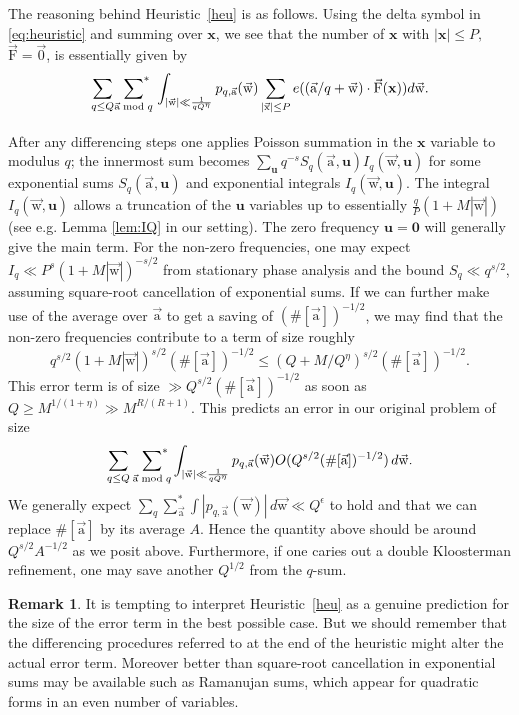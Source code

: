 \documentclass[letterpaper,11pt]{amsart}
\numberwithin{equation}{section}
\theoremstyle{definition}
\newtheorem{remark}[theorem]{Remark}
\numberwithin{equation}{section}
\newcommand{\x}{\mathbf{x}}
\newcommand{\uu}{\mathbf{u}}
\newcommand{\starsum}{\sideset{}{^*}\sum}
\newcommand{\ux}{{\vec{\mathrm{x}}}}
\newcommand{\ua}{\vec{\mathrm{a}}}
\newcommand{\uw}{{\vec{\mathrm{w}}}}
\newcommand{\uF}{{\vec{\mathrm{F}} }}
\begin{document}
The reasoning behind Heuristic~\ref{heu} is as follows. Using the delta symbol in \eqref{eq:heuristic} and summing over $\x$, we see that the number of $\x$ with $|\x|\leq P,$ $\uF=\vec{0}$, is essentially given by
\begin{equation*}
    \sum_{q\leq Q}\underset{\hphantom{\ua\bmod{q}}}{\starsum_{\ua\bmod{q}}}
\int_{|\uw|\ll \frac{1}{qQ^{\eta}}}p_{q, \ua}(\uw)\sum_{|\ux|\leq P}e((\ua/q+\uw)\cdot \uF (\mathbf{x}))
			d\uw.
\end{equation*}
After any differencing steps one applies Poisson summation in the $\x$ variable to modulus $q$; the innermost sum becomes $\sum_{\uu} q^{-s}S_q(\ua,\uu)I_q(\uw,\uu)$ for some exponential sums $S_q(\ua, \uu)$ and exponential integrals $I_q(\uw, \uu)$. The integral $I_q(\uw, \uu)$ allows a truncation of the $\uu$ variables up to essentially $\frac{q}{P}(1+M|\uw|)$ (see e.g. Lemma \ref{lem:IQ} in our setting). The zero frequency $\uu=\mathbf 0$ will generally give the main term. For the non-zero frequencies, one may expect $I_q\ll P^s(1+M|\uw|)^{-s/2}$ from stationary phase analysis and the bound $S_q\ll q^{s/2}$, assuming square-root cancellation of exponential sums. If we can further make use of the average over $\ua$ to get a saving of $(\#[\ua])^{-1/2}$, we may find that the non-zero frequencies contribute to a term of size roughly $$q^{s/2}(1+M|\uw|)^{s/2}(\#[\ua])^{-1/2}\leq (Q+M/Q^\eta)^{s/2}(\#[\ua])^{-1/2}.$$ This error term is of size $\gg Q^{s/2}(\#[\ua])^{-1/2}$ as soon as $Q\geq M^{1/(1+\eta)}\gg M^{R/(R+1)}$. This predicts an error in our original problem of size
$$
\sum_{q\leq Q}\ {\starsum_{\ua\bmod{q}}}
\int_{|\uw|\ll \frac{1}{qQ^{\eta}}}p_{q, \ua}(\uw)
O(Q^{s/2}(\#[\ua])^{-1/2})\,d\uw.
$$
We generally expect $\sum_{q}\sum_{\ua}^*\int |p_{q,\ua}(\uw)|\,d\uw \ll Q^\epsilon$ to hold and that we can replace $\#[\ua]$ by its average $A$. Hence the quantity above should be around $Q^{s/2}A^{-1/2}$ as we posit above.
Furthermore, if one caries out a double Kloosterman refinement, one may save another $Q^{1/2}$ from the $q$-sum.


\begin{remark}
    It is tempting to interpret Heuristic~\ref{heu} as a genuine prediction for the size of the error term in the best possible case. 
    But we should remember that the differencing procedures referred to at the end of the heuristic might alter the actual error term. Moreover better than square-root cancellation in exponential sums may be available such as 
     Ramanujan sums, which appear for quadratic forms in an even number of variables.
\end{remark}
    
\end{document}
